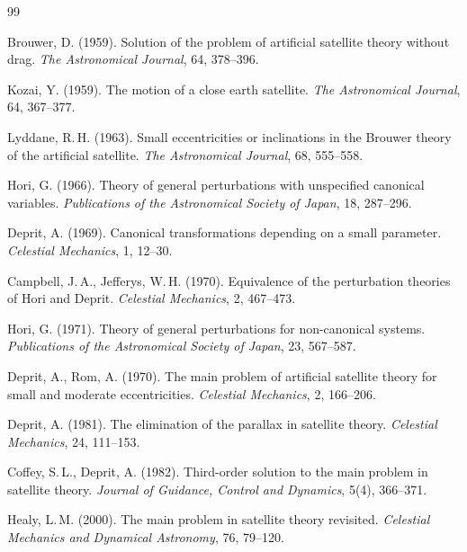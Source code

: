 \documentclass[11pt]{article}
\begin{document}
\begin{thebibliography}{99}


Brouwer, D. (1959).
Solution of the problem of artificial satellite theory without drag.
\textit{The Astronomical Journal}, 64, 378--396.

Kozai, Y. (1959).
The motion of a close earth satellite.
\textit{The Astronomical Journal}, 64, 367--377.

Lyddane, R.\,H. (1963).
Small eccentricities or inclinations in the Brouwer theory
of the artificial satellite.
\textit{The Astronomical Journal}, 68, 555--558.


Hori, G. (1966).
Theory of general perturbations with unspecified canonical variables.
\textit{Publications of the Astronomical Society of Japan}, 18, 287--296.

Deprit, A. (1969).
Canonical transformations depending on a small parameter.
\textit{Celestial Mechanics}, 1, 12--30.

Campbell, J.\,A., Jefferys, W.\,H. (1970).
Equivalence of the perturbation theories of Hori and Deprit.
\textit{Celestial Mechanics}, 2, 467--473.

Hori, G. (1971).
Theory of general perturbations for non-canonical systems.
\textit{Publications of the Astronomical Society of Japan}, 23, 567--587.


Deprit, A., Rom, A. (1970).
The main problem of artificial satellite theory for small and moderate
eccentricities.
\textit{Celestial Mechanics}, 2, 166--206.

Deprit, A. (1981).
The elimination of the parallax in satellite theory.
\textit{Celestial Mechanics}, 24, 111--153.

Coffey, S.\,L., Deprit, A. (1982).
Third-order solution to the main problem in satellite theory.
\textit{Journal of Guidance, Control and Dynamics}, 5(4), 366--371.

Healy, L.\,M. (2000).
The main problem in satellite theory revisited.
\textit{Celestial Mechanics and Dynamical Astronomy}, 76, 79--120.



\end{thebibliography}
\end{document}
